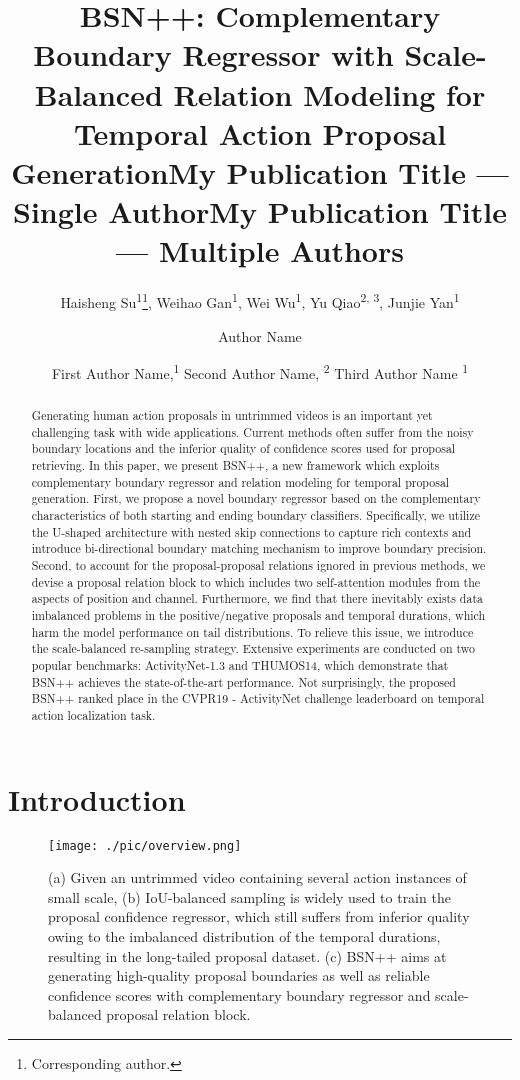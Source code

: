 \documentclass[letterpaper]{article} \usepackage{aaai21}  \usepackage{times}  \usepackage{helvet} \usepackage{courier}  \usepackage[hyphens]{url}  \usepackage{graphicx} \urlstyle{rm} \def\UrlFont{\rm}  \usepackage{natbib}  \usepackage{amsmath,amssymb} \usepackage{caption} \frenchspacing  \usepackage{color}
\title{BSN++: Complementary Boundary Regressor with Scale-Balanced Relation Modeling for Temporal Action Proposal Generation}
\author{
Haisheng Su\textsuperscript{\rm 1}\thanks{Corresponding author.},
        Weihao Gan\textsuperscript{\rm 1}, 
        Wei Wu\textsuperscript{\rm 1},
        Yu Qiao\textsuperscript{\rm 2, 3},
        Junjie Yan\textsuperscript{\rm 1}
    \\
}
\title{My Publication Title --- Single Author}
\author {
Author Name \\
}
\title{My Publication Title --- Multiple Authors}
\author {
First Author Name,\textsuperscript{\rm 1}
    Second Author Name, \textsuperscript{\rm 2}
    Third Author Name \textsuperscript{\rm 1} \\
}
\begin{document}
\maketitle

\begin{abstract}
Generating human action proposals in untrimmed videos is an important yet challenging task with wide applications. Current methods often suffer from the noisy boundary locations and the inferior quality of confidence scores used for proposal retrieving. In this paper, we present BSN++, a new framework which exploits complementary boundary regressor and relation modeling for temporal proposal generation. First, we propose a novel boundary regressor based on the complementary characteristics of both starting and ending boundary classifiers. Specifically, we utilize the U-shaped architecture with nested skip connections to capture rich contexts and introduce bi-directional boundary matching mechanism to improve boundary precision. Second, to account for the proposal-proposal relations ignored in previous methods, we devise a proposal relation block to which includes two self-attention modules from the aspects of position and channel. Furthermore, we find that there inevitably exists data imbalanced problems in the positive/negative proposals and temporal durations, which harm the model performance on tail distributions. To relieve this issue, we introduce the scale-balanced re-sampling strategy. Extensive experiments are conducted on two popular benchmarks: ActivityNet-1.3 and THUMOS14, which demonstrate that BSN++ achieves the state-of-the-art performance. Not surprisingly, the proposed BSN++ ranked  place in the CVPR19 - ActivityNet challenge leaderboard on temporal action localization task. 



\end{abstract}



\section{Introduction}

\begin{figure}[t]
	\centering
\texttt{[image: ./pic/overview.png]} \caption{(a) Given an untrimmed video containing several action instances of small scale, (b) IoU-balanced sampling is widely used to train the proposal confidence regressor, which still suffers from inferior quality owing to the imbalanced distribution of the temporal durations, resulting in the long-tailed proposal dataset. (c) BSN++ aims at generating high-quality proposal boundaries as well as reliable confidence scores with complementary boundary regressor and scale-balanced proposal relation block. }
	\label{fig:overview}
\end{figure}
\end{document}
